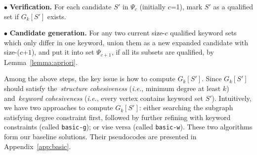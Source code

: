 $\bullet$ {\bf Verification.} For each candidate $S'$ in $\Psi_c$ (initially $c$=1),
mark $S'$ as a qualified set if $G_k[S']$ exists.

$\bullet$ {\bf Candidate generation.} For any two current size-$c$ qualified keyword sets which only differ in one keyword, union them as a new expanded candidate with size-($c$+$1$), and put it into set $\Psi_{c+1}$, if all its subsets are qualified, by Lemma~\ref{lemma:apriori}.

Among the above steps, the key issue is how to compute $G_k[S']$.
Since $G_k[S']$ should satisfy the~\emph{structure cohesiveness} (\textit{i.e.}, minimum degree at least $k$)
and~\emph{keyword cohesiveness} (\textit{i.e.}, every vertex contains keyword set $S'$).
Intuitively, we have two approaches to compute $G_k[S']$:
either searching the subgraph satisfying degree constraint first,
followed by further refining with keyword constraints (called {\tt basic-g});
or vise versa (called {\tt basic-w}).
These two algorithms form our baseline solutions.
Their pseudocodes are presented in Appendix~\ref{app:basic}. 